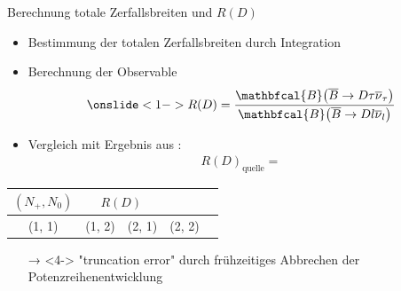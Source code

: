 \documentclass[fleqn, aspectratio=1610, professionalfonts, 9pt]{beamer}
\begin{document}
\begin{frame}{Berechnung totale Zerfallsbreiten und $R(D)$}
  \begin{minipage}{7cm}
    \begin{itemize}
      \setlength\itemsep{1em}
      \item<1-> Bestimmung der totalen Zerfallsbreiten durch Integration
      \item<2-> Berechnung der Observable
      \begin{align*}
        \onslide<1->{ R(D) = \frac{{\mathbfcal{B}}\!\left(\overline{B} \to D \tau \overline{\nu}_\tau \right)}{{\mathbfcal{B}}\!\left(\overline{B} \to D l \overline{\nu}_l \right)} }
      \end{align*}
      \item<3-> Vergleich mit Ergebnis aus \cite{PhysRevD.92.034506}:
      \begin{align*}
          R(D)_\text{quelle} = 
      \end{align*}
    \end{itemize}
  \end{minipage}
  \begin{minipage}{7cm}
    \begin{table}
        \centering
        \begin{tabular}{
        S[]
      	S[table-format=1.3]
      	@{${}\pm{}$}
      	S[table-format=1.3]
      	}
      	\toprule
        {$(N_+, N_0)$}  &  \\
        \midrule
        \rule{0pt}{2.2ex}
        (1, 1) & 
        (1, 2) & 
        (2, 1) & 
        (2, 2) & 
        \bottomrule
        \label{tab:r_calc}
        \end{tabular}
    \end{table}
    \begin{itemize}
      \item[→]<4-> "truncation error" durch frühzeitiges Abbrechen der Potenzreihenentwicklung
    \end{itemize}
  \end{minipage}%
\end{frame}
\end{document}
